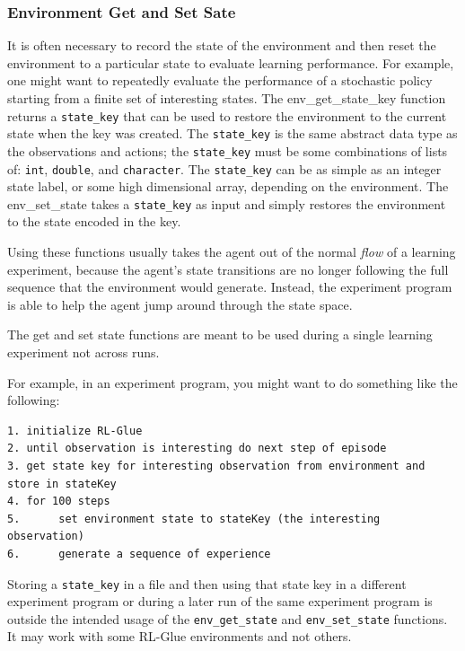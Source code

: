 \documentclass[11pt]{article}
\begin{document}
\subsubsection{Environment Get and Set Sate}
It is often necessary to record the state of the environment and then reset the environment to a particular state to evaluate learning performance. For example, one might want to repeatedly evaluate the performance of a stochastic policy starting from a finite set of interesting states. The env\_get\_state\_key function returns a \texttt{state\_key} that can be used to restore the environment to the current state when the key was created. The \texttt{state\_key} is the same abstract data type as the observations and actions; the \texttt{state\_key} must be some combinations of lists of: \texttt{int}, \texttt{double}, and \texttt{character}. The \texttt{state\_key} can be as simple as an integer state label, or some high dimensional array, depending on the environment.  The env\_set\_state takes a \texttt{state\_key} as input and simply restores the environment to the state encoded in the key.

Using these functions usually takes the agent out of the normal \textit{flow} of a learning experiment, because the agent's state transitions are no longer following the full sequence
that the environment would generate.  Instead, the experiment program is able to help the agent jump around through the state space.

The get and set state functions are meant to be used during a single learning experiment not across runs.

For example, in an experiment program, you might want to do something like the following:
\begin{verbatim}
1. initialize RL-Glue
2. until observation is interesting do next step of episode
3. get state key for interesting observation from environment and store in stateKey
4. for 100 steps
5.      set environment state to stateKey (the interesting observation)
6.      generate a sequence of experience
\end{verbatim}

Storing a \texttt{state\_key} in a file and then using that state key in a different experiment program or during a later run of the same experiment program is outside the intended 
usage of the \texttt{env\_get\_state} and \texttt{env\_set\_state} functions. It may work with some RL-Glue environments and not others.
        
\end{document}
